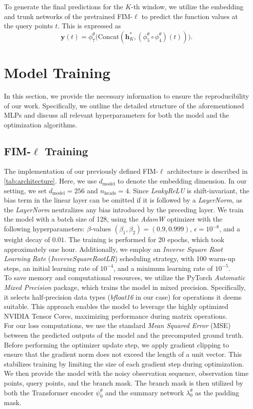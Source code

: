 \documentclass{article}
\theoremstyle{plain}
\theoremstyle{definition}
\theoremstyle{remark}
\begin{document}
To generate the final predictions for the \(K\)-th window, we utilize the embedding and trunk networks of the pretrained FIM-\(\ell\) to predict the function values at the query points \(t\). This is expressed as
\[
    \mathbf{y}(t) = \phi^{\theta}_7\big(\text{Concat}(\mathbf{h}^*_K, (\phi^{\theta}_5 \circ \phi^{\theta}_4)(t))\big).
\]
\section{Model Training}
In this section, we provide the necessary information to ensure the reproducibility of our work. Specifically, we outline the detailed structure of the aforementioned MLPs and discuss all relevant hyperparameters for both the model and the optimization algorithms.
\subsection{FIM-$\ell$ Training}\label{sec:FIM-l}
The implementation of our previously defined FIM-$\ell$ architecture is described in 
\ref{tab:architecture}. Here, we use \(d_{\text{model}}\) to denote the embedding dimension. In our setting, we set \(d_{\text{model}} = 256\) and \(n_{\text{heads}} = 4\). Since \emph{LeakyReLU} is shift-invariant, the bias term in the linear layer can be omitted if it is followed by a \emph{LayerNorm}, as the \emph{LayerNorm} neutralizes any bias introduced by the preceding layer.
We train the model with a batch size of 128, using the \emph{AdamW} optimizer with the following hyperparameters: \(\beta\)-values \((\beta_1, \beta_2) = (0.9, 0.999)\), \(\epsilon = 10^{-8}\), and a weight decay of \(0.01\). The training is performed for 20 epochs, which took approximately one hour.
Additionally, we employ an \emph{Inverse Square Root Learning Rate} (\emph{InverseSquareRootLR})\cite{??} scheduling strategy, 
with 100 warm-up steps, an initial learning rate of \(10^{-4}\), and a minimum learning rate of \(10^{-5}\).\\
To save memory and computational resources, we utilize the PyTorch \emph{Automatic Mixed Precision} package, which trains the model in mixed precision. Specifically, it selects half-precision data types (\emph{bfloat16} in our case) for operations it deems suitable. This approach enables the model to leverage the highly optimized NVIDIA Tensor Cores, maximizing performance during matrix operations.\\
For our loss computations, we use the standard \emph{Mean Squared Error} (MSE) between the predicted outputs of the model and the precomputed ground truth. Before performing the optimizer update step, we apply gradient clipping to ensure that the gradient norm does not exceed the length of a unit vector. This stabilizes training by limiting the size of each gradient step during optimization.\\
We then provide the model with the noisy observation sequence, observation time points, query points, and the branch mask. The branch mask is then utilized by both the Transformer encoder \(\psi^{\theta}_0\) and the summary network \(\lambda^{\theta}_0\) as the padding mask.
\end{document}
